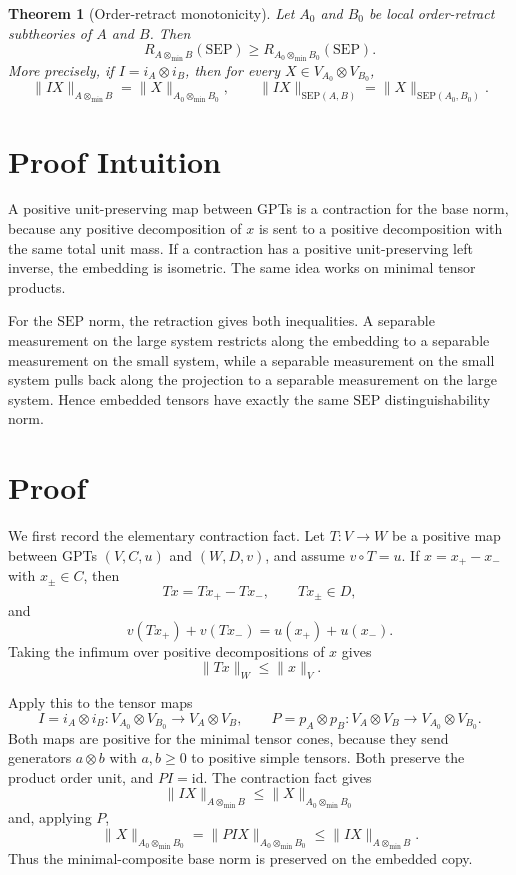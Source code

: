 \documentclass[11pt]{article}
\newtheorem{theorem}{Theorem}
\newcommand{\SEP}{\mathrm{SEP}}
\newcommand{\id}{\mathrm{id}}
\newcommand{\tmin}{\otimes_{\min}}
\begin{document}
\begin{theorem}[Order-retract monotonicity]
Let \(A_0\) and \(B_0\) be local order-retract subtheories of \(A\) and \(B\).
Then
\[
  R_{A\tmin B}(\SEP)\ge R_{A_0\tmin B_0}(\SEP).
\]
More precisely, if \(I=i_A\otimes i_B\), then for every
\(X\in V_{A_0}\otimes V_{B_0}\),
\[
  \|I X\|_{A\tmin B}=\|X\|_{A_0\tmin B_0},
  \qquad
  \|I X\|_{\SEP(A,B)}=\|X\|_{\SEP(A_0,B_0)}.
\]
\end{theorem}

\section*{Proof Intuition}

A positive unit-preserving map between GPTs is a contraction for the base
norm, because any positive decomposition of \(x\) is sent to a positive
decomposition with the same total unit mass.  If a contraction has a positive
unit-preserving left inverse, the embedding is isometric.  The same idea works
on minimal tensor products.

For the \(\SEP\) norm, the retraction gives both inequalities.  A separable
measurement on the large system restricts along the embedding to a separable
measurement on the small system, while a separable measurement on the small
system pulls back along the projection to a separable measurement on the
large system.  Hence embedded tensors have exactly the same \(\SEP\)
distinguishability norm.

\section*{Proof}

We first record the elementary contraction fact.  Let \(T:V\to W\) be a
positive map between GPTs \((V,C,u)\) and \((W,D,v)\), and assume
\(v\circ T=u\).  If \(x=x_+-x_-\) with \(x_\pm\in C\), then
\[
  Tx=Tx_+-Tx_-,\qquad Tx_\pm\in D,
\]
and
\[
  v(Tx_+)+v(Tx_-)=u(x_+)+u(x_-).
\]
Taking the infimum over positive decompositions of \(x\) gives
\[
  \|Tx\|_W\le \|x\|_V .
\]

Apply this to the tensor maps
\[
  I=i_A\otimes i_B:
    V_{A_0}\otimes V_{B_0}\to V_A\otimes V_B,
  \qquad
  P=p_A\otimes p_B:
    V_A\otimes V_B\to V_{A_0}\otimes V_{B_0}.
\]
Both maps are positive for the minimal tensor cones, because they send
generators \(a\otimes b\) with \(a,b\ge0\) to positive simple tensors.  Both
preserve the product order unit, and \(PI=\id\).  The contraction fact gives
\[
  \|I X\|_{A\tmin B}\le \|X\|_{A_0\tmin B_0}
\]
and, applying \(P\),
\[
  \|X\|_{A_0\tmin B_0}
  =
  \|P I X\|_{A_0\tmin B_0}
  \le
  \|I X\|_{A\tmin B}.
\]
Thus the minimal-composite base norm is preserved on the embedded copy.
\end{document}
